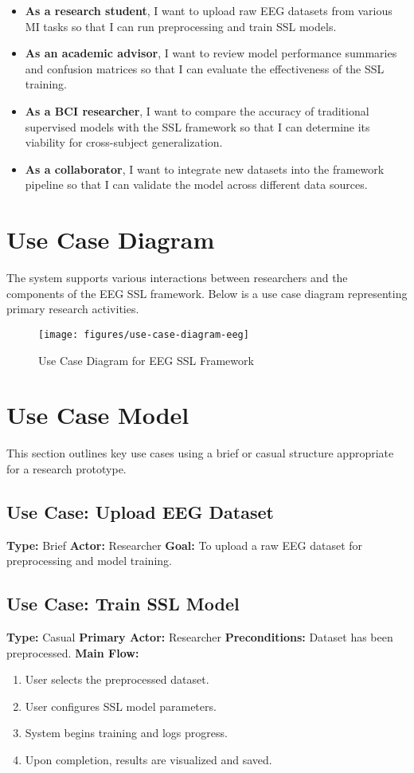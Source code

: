 \begin{itemize}
    \item \textbf{As a research student}, I want to upload raw EEG datasets from various MI tasks so that I can run preprocessing and train SSL models.
    \item \textbf{As an academic advisor}, I want to review model performance summaries and confusion matrices so that I can evaluate the effectiveness of the SSL training.
    \item \textbf{As a BCI researcher}, I want to compare the accuracy of traditional supervised models with the SSL framework so that I can determine its viability for cross-subject generalization.
    \item \textbf{As a collaborator}, I want to integrate new datasets into the framework pipeline so that I can validate the model across different data sources.
\end{itemize}


\section{Use Case Diagram}
\label{sec:use-case-diagram}
The system supports various interactions between researchers and the components of the EEG SSL framework. Below is a use case diagram representing primary research activities.


\begin{figure}[H]
    \centering
    \texttt{[image: figures/use-case-diagram-eeg]}
    \caption{Use Case Diagram for EEG SSL Framework}\label{fig:figure}
\end{figure}
\newpage

\section{Use Case Model}
\label{sec:use-case-model}

This section outlines key use cases using a brief or casual structure appropriate for a research prototype.

\subsection*{Use Case: Upload EEG Dataset}
\textbf{Type:} Brief
\textbf{Actor:} Researcher
\textbf{Goal:} To upload a raw EEG dataset for preprocessing and model training.

\subsection*{Use Case: Train SSL Model}
\textbf{Type:} Casual
\textbf{Primary Actor:} Researcher
\textbf{Preconditions:} Dataset has been preprocessed.
\textbf{Main Flow:}
\begin{enumerate}
    \item User selects the preprocessed dataset.
    \item User configures SSL model parameters.
    \item System begins training and logs progress.
    \item Upon completion, results are visualized and saved.
\end{enumerate}

